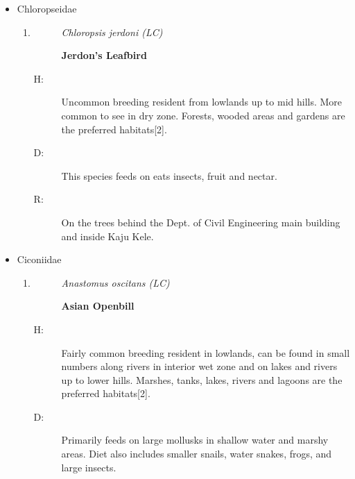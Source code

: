 \begin{itemize}
\begin{enumerate}
%
\end{enumerate}%
\item%
Chloropseidae%
\begin{enumerate}%
\item%
\begin{description}%
\item[]%
\textit{Chloropsis jerdoni (LC)}%
\item[]%
\textbf{Jerdon's Leafbird}%
\end{description}%
\begin{description}%
\item[H: ]%
Uncommon breeding resident from lowlands up to mid hills. More common to see in dry zone. Forests, wooded areas and gardens are the preferred habitats{[}2{]}.%
\item[D: ]%
This species feeds on eats insects, fruit and nectar. %
\item[R: ]%
On the trees behind the Dept. of Civil Engineering main building and inside Kaju Kele.%
\end{description}%
\end{enumerate}%
\item%
Ciconiidae%
\begin{enumerate}%
\item%
\begin{description}%
\item[]%
\textit{Anastomus oscitans (LC)}%
\item[]%
\textbf{Asian Openbill}%
\end{description}%
\begin{description}%
\item[H: ]%
Fairly common breeding resident in lowlands, can be found in small numbers along rivers in interior wet zone and on lakes and rivers up to lower hills. Marshes, tanks, lakes, rivers and lagoons are the preferred habitats{[}2{]}.%
\item[D: ]%
Primarily feeds on large mollusks in shallow water and marshy areas. Diet also includes smaller snails, water snakes, frogs, and large insects.%

\end{description}
\end{enumerate}
\end{itemize}
